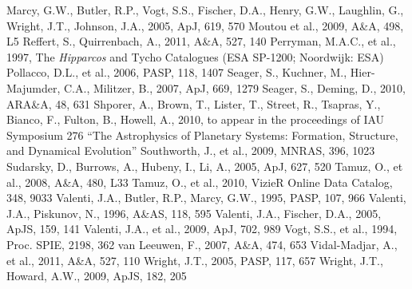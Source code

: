 \documentclass[12pt,preprint]{emulateapj}
\begin{document}
\begin{thebibliography}{}
 Marcy,
  G.W., Butler, R.P., Vogt, S.S., Fischer, D.A., Henry, G.W.,
  Laughlin, G., Wright, J.T., Johnson, J.A., 2005, ApJ, 619, 570
 Moutou
  et al., 2009, A\&A, 498, L5
  Reffert, S., Quirrenbach, A., 2011, A\&A, 527, 140
  Perryman, M.A.C., et al., 1997, The {\it Hipparcos} and Tycho
  Catalogues (ESA SP-1200; Noordwijk: ESA)
  Pollacco, D.L., et al., 2006, PASP, 118, 1407
 Seager,
  S., Kuchner, M., Hier-Majumder, C.A., Militzer, B., 2007, ApJ, 669,
  1279
  Seager, S., Deming, D., 2010, ARA\&A, 48, 631
  Shporer, A., Brown, T., Lister, T., Street, R., Tsapras, Y., Bianco,
  F., Fulton, B., Howell, A., 2010, to appear in the proceedings of
  IAU Symposium 276 ``The Astrophysics of Planetary Systems:
  Formation, Structure, and Dynamical Evolution''
  Southworth, J., et al., 2009, MNRAS, 396, 1023
  Sudarsky, D., Burrows, A., Hubeny, I., Li, A., 2005, ApJ, 627, 520
 Tamuz,
  O., et al., 2008, A\&A, 480, L33
 Tamuz,
  O., et al., 2010, VizieR Online Data Catalog, 348, 9033
  Valenti, J.A., Butler, R.P., Marcy, G.W., 1995, PASP, 107, 966
  Valenti, J.A., Piskunov, N., 1996, A\&AS, 118, 595
  Valenti, J.A., Fischer, D.A., 2005, ApJS, 159, 141
  Valenti, J.A., et al., 2009, ApJ, 702, 989
 Vogt,
  S.S., et al., 1994, Proc. SPIE, 2198, 362
  van Leeuwen, F., 2007, A\&A, 474, 653
  Vidal-Madjar, A., et al., 2011, A\&A, 527, 110
 Wright, J.T.,
  2005, PASP, 117, 657
  Wright, J.T., Howard, A.W., 2009, ApJS, 182, 205

\end{thebibliography}
\end{document}
